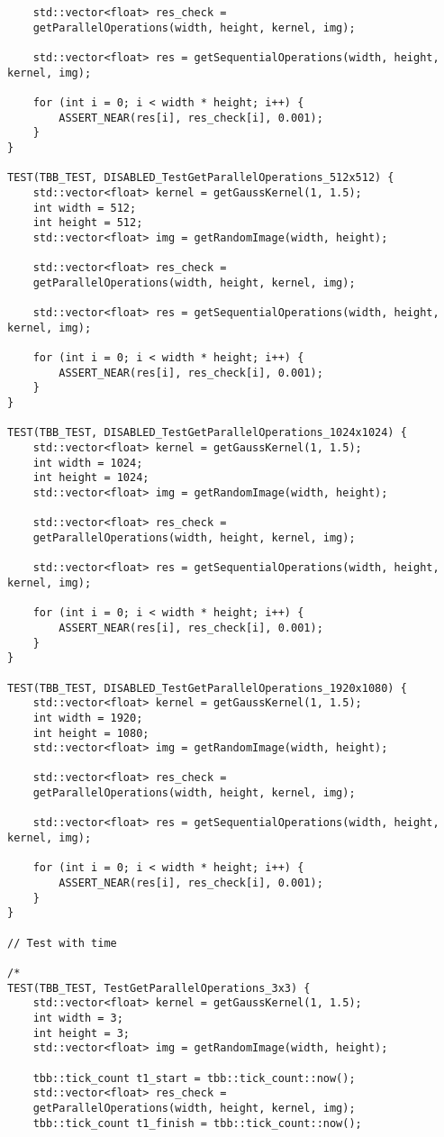 \documentclass{report}
\begin{document}
\begin{lstlisting}
	std::vector<float> res_check =
	getParallelOperations(width, height, kernel, img);
	
	std::vector<float> res = getSequentialOperations(width, height, kernel, img);
	
	for (int i = 0; i < width * height; i++) {
		ASSERT_NEAR(res[i], res_check[i], 0.001);
	}
}

TEST(TBB_TEST, DISABLED_TestGetParallelOperations_512x512) {
	std::vector<float> kernel = getGaussKernel(1, 1.5);
	int width = 512;
	int height = 512;
	std::vector<float> img = getRandomImage(width, height);
	
	std::vector<float> res_check =
	getParallelOperations(width, height, kernel, img);
	
	std::vector<float> res = getSequentialOperations(width, height, kernel, img);
	
	for (int i = 0; i < width * height; i++) {
		ASSERT_NEAR(res[i], res_check[i], 0.001);
	}
}

TEST(TBB_TEST, DISABLED_TestGetParallelOperations_1024x1024) {
	std::vector<float> kernel = getGaussKernel(1, 1.5);
	int width = 1024;
	int height = 1024;
	std::vector<float> img = getRandomImage(width, height);
	
	std::vector<float> res_check =
	getParallelOperations(width, height, kernel, img);
	
	std::vector<float> res = getSequentialOperations(width, height, kernel, img);
	
	for (int i = 0; i < width * height; i++) {
		ASSERT_NEAR(res[i], res_check[i], 0.001);
	}
}

TEST(TBB_TEST, DISABLED_TestGetParallelOperations_1920x1080) {
	std::vector<float> kernel = getGaussKernel(1, 1.5);
	int width = 1920;
	int height = 1080;
	std::vector<float> img = getRandomImage(width, height);
	
	std::vector<float> res_check =
	getParallelOperations(width, height, kernel, img);
	
	std::vector<float> res = getSequentialOperations(width, height, kernel, img);
	
	for (int i = 0; i < width * height; i++) {
		ASSERT_NEAR(res[i], res_check[i], 0.001);
	}
}

// Test with time

/*
TEST(TBB_TEST, TestGetParallelOperations_3x3) {
	std::vector<float> kernel = getGaussKernel(1, 1.5);
	int width = 3;
	int height = 3;
	std::vector<float> img = getRandomImage(width, height);
	
	tbb::tick_count t1_start = tbb::tick_count::now();
	std::vector<float> res_check =
	getParallelOperations(width, height, kernel, img);
	tbb::tick_count t1_finish = tbb::tick_count::now();
	

\end{lstlisting}
\end{document}

